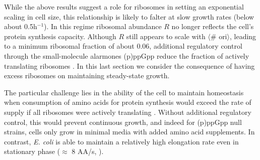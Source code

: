 While the above results suggest a role for ribosomes in setting an
exponential scaling in cell size, this relationship is likely to falter at slow
growth rates (below about 0.5h$^{-1}$). In this regime ribosomal abundance $R$
no longer reflects the cell's protein synthesis capacity.
Although $R$ still appears to scale with $\langle$\# ori$\rangle$, leading to a minimum
ribosomal fraction of about 0.06, additional regulatory control through the
small-molecule alarmones (p)ppGpp  reduce the fraction of actively
translating ribosomes \citep{dai2016, bosdriesz2015, zhu2019}.
In this last section we consider the consequence of having
excess ribosomes on maintaining steady-state growth.


The particular challenge lies in the ability of the cell to maintain homeostasis
when consumption of amino acids for protein synthesis would exceed the rate of
supply if all ribosomes were actively translating
. Without additional regulatory control, this
would prevent continuous growth, and indeed for (p)ppGpp null strains, cells
only grow in minimal media with added amino acid supplements. In contrast,
\textit{E. coli} is able to maintain a relatively high elongation rate even in
stationary phase ($\approx$ 8 AA/s, \citep{dai2016, dai2018}).


